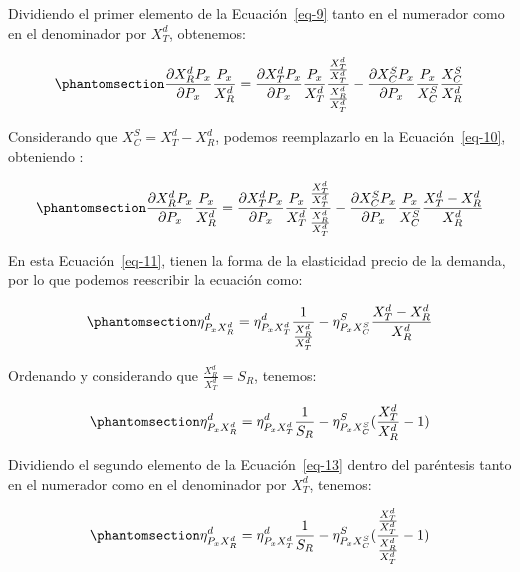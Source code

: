 \documentclass[
  doc,
  floatsintext,
  longtable,
  a4paper,
  nolmodern,
  notxfonts,
  notimes,
  12pt,
  colorlinks=true,linkcolor=blue,citecolor=blue,urlcolor=blue]{apa7}
\begin{document}
Dividiendo el primer elemento de la Ecuación~\ref{eq-9} tanto en el
numerador como en el denominador por \(X_T^d\), obtenemos:

\begin{equation}\protect\phantomsection\label{eq-10}{
\frac{\partial X_R^d P_x}{\partial P_x} \frac{P_x}{X_R^d} = \frac{\partial X_T^d P_x}{\partial P_x} \frac{P_x}{X_T^d} \frac{\frac{X_T^d}{X_T^d}}{\frac{X_R^d}{X_T^d}} - \frac{\partial X_C^S P_x}{\partial P_x} \frac{P_x}{X_C^S} \frac{X_C^S}{X_R^d}
}\end{equation}

Considerando que \(X_C^S = X_T^d - X_R^d\), podemos reemplazarlo en la
Ecuación~\ref{eq-10}, obteniendo :

\begin{equation}\protect\phantomsection\label{eq-11}{
\frac{\partial X_R^d P_x}{\partial P_x} \frac{P_x}{X_R^d} = \frac{\partial X_T^d P_x}{\partial P_x} \frac{P_x}{X_T^d} \frac{\frac{X_T^d}{X_T^d}}{\frac{X_R^d}{X_T^d}} - \frac{\partial X_C^S P_x}{\partial P_x} \frac{P_x}{X_C^S} \frac{X_T^d - X_R^d}{X_R^d}
}\end{equation}

En esta Ecuación~\ref{eq-11}, tienen la forma de la elasticidad precio
de la demanda, por lo que podemos reescribir la ecuación como:

\begin{equation}\protect\phantomsection\label{eq-12}{
\eta_{P_{x}X_R^d}^d = \eta_{P_{x}X_T^d}^d \frac{1}{\frac{X_R^d}{X_T^d}} - \eta_{P_{x}X_C^S}^S \frac{X_T^d - X_R^d}{X_R^d}
}\end{equation}

Ordenando y considerando que \(\frac{X_R^d}{X_T^d} = S_R\), tenemos:

\begin{equation}\protect\phantomsection\label{eq-13}{
\eta_{P_{x}X_R^d}^d = \eta_{P_{x}X_T^d}^d \frac{1}{S_R} - \eta_{P_{x}X_C^S}^S (\frac{X_T^d}{X_R^d} - 1)
}\end{equation}

Dividiendo el segundo elemento de la Ecuación~\ref{eq-13} dentro del
paréntesis tanto en el numerador como en el denominador por \(X_T^d\),
tenemos:

\begin{equation}\protect\phantomsection\label{eq-14}{
\eta_{P_{x}X_R^d}^d = \eta_{P_{x}X_T^d}^d \frac{1}{S_R} - \eta_{P_{x}X_C^S}^S (\frac{\frac{X_T^d}{X_T^d}}{\frac{X_R^d}{X_T^d}} - 1)
}\end{equation}
\end{document}
